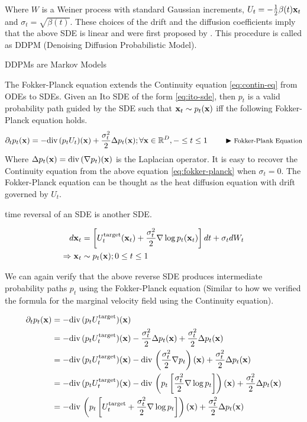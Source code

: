 \documentclass[a4paper, 11pt]{article}
\begin{document}
Where $W$ is a Weiner process with standard Gaussian increments, $U_t = -\frac{1}{2} \beta(t) \mbox{$\mbox{$\mathbf{x}$}$}_t$ and $\sigma_t = \sqrt{\beta(t)}$. These choices of the drift and the diffusion coefficients imply that the above SDE is linear and were first proposed by \cite{ho2020denoising}. This procedure is called as DDPM (Denoising Diffusion  Probabilistic Model). 

DDPMs are Markov Models


The Fokker-Planck equation extends the Continuity equation \eqref{eq:contin-eq} from ODEs to SDEs. Given an Ito SDE of the form \eqref{eq:ito-sde}, then $p_t$ is a valid probability path guided by the SDE such that $\mbox{$\mbox{$\mathbf{x}$}$}_t \sim p_t(\mbox{$\mbox{$\mathbf{x}$}$})$ iff the following Fokker-Planck equation holds.
\begin{align}
    \partial_t p_t(\mbox{$\mbox{$\mathbf{x}$}$}) = -\text{div}\, (p_t U_t)(\mbox{$\mbox{$\mathbf{x}$}$}) + \frac{\sigma_t^2}{2} \Delta p_t(\mbox{$\mbox{$\mathbf{x}$}$}); \forall \mbox{$\mbox{$\mathbf{x}$}$} \in \mathbb{R}^D, - \leq t \leq 1 \qquad \blacktriangleright\text{\footnotesize Fokker-Plank Equation} \label{eq:fokker-planck}
\end{align}
Where $\Delta p_t(\mbox{$\mbox{$\mathbf{x}$}$}) = \text{div}\, (\nabla p_t)(\mbox{$\mbox{$\mathbf{x}$}$})$ is the Laplacian operator. It is easy to recover the Continuity equation from the above equation \eqref{eq:fokker-planck} when $\sigma_t = 0$. The Fokker-Planck equation can be thought as the heat diffusion equation with drift governed by $U_t$.

time reversal of an SDE is another SDE. 

\begin{align}
    d\mbox{$\mbox{$\mathbf{x}$}$}_t &= \left [U_t^{\text{target}}(\mbox{$\mbox{$\mathbf{x}$}$}_t) + \frac{\sigma_t^2}{2} \nabla \log p_t(\mbox{$\mbox{$\mathbf{x}$}$}_t) \right ] dt + \sigma_t d W_t \\
    \Rightarrow \mbox{$\mbox{$\mathbf{x}$}$}_t &\sim p_t(\mbox{$\mbox{$\mathbf{x}$}$}); 0 \leq t \leq 1
\end{align}

We can again verify that the above reverse SDE produces intermediate probability paths $p_t$ using the Fokker-Planck equation (Similar to how we verified the formula for the marginal velocity field using the Continuity equation).

\begin{align}
    \partial_t p_t(\mbox{$\mbox{$\mathbf{x}$}$}) &= - \text{div}\,(p_t U_t^{\text{target}})(\mbox{$\mbox{$\mathbf{x}$}$}) \\
    &= - \text{div}\,(p_t U_t^{\text{target}})(\mbox{$\mbox{$\mathbf{x}$}$}) - \frac{\sigma_t^2}{2}\Delta p_t(\mbox{$\mbox{$\mathbf{x}$}$}) + \frac{\sigma_t^2}{2}\Delta p_t(\mbox{$\mbox{$\mathbf{x}$}$}) \\
    &= - \text{div}\,(p_t U_t^{\text{target}})(\mbox{$\mbox{$\mathbf{x}$}$}) - \text{div}\, \left (\frac{\sigma_t^2}{2}\nabla p_t\right )(\mbox{$\mbox{$\mathbf{x}$}$})  + \frac{\sigma_t^2}{2}\Delta p_t(\mbox{$\mbox{$\mathbf{x}$}$}) \\
    &= - \text{div}\,(p_t U_t^{\text{target}})(\mbox{$\mbox{$\mathbf{x}$}$}) - \text{div}\, \left (p_t \left [ \frac{\sigma_t^2}{2}\nabla \log p_t \right ] \right )(\mbox{$\mbox{$\mathbf{x}$}$})  + \frac{\sigma_t^2}{2}\Delta p_t(\mbox{$\mbox{$\mathbf{x}$}$}) \\
    &= - \text{div}\, \left (p_t \left [U_t^{\text{target}} + \frac{\sigma_t^2}{2} \nabla \log p_t \right ] \right )(\mbox{$\mbox{$\mathbf{x}$}$})  + \frac{\sigma_t^2}{2}\Delta p_t(\mbox{$\mbox{$\mathbf{x}$}$}) \\
\end{align}
\end{document}
